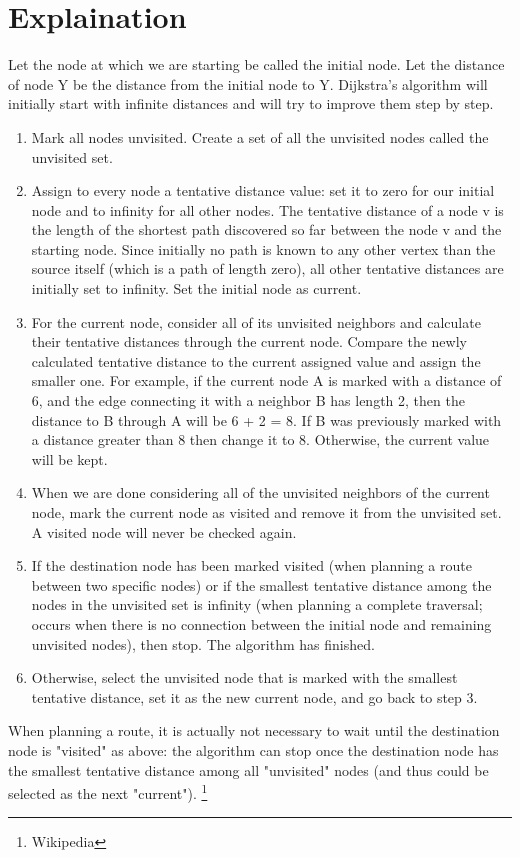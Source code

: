 \documentclass[12pt]{book}
\begin{document}
\section*{Explaination}
{\small
Let the node at which we are starting be called the initial node. 
Let the distance of node Y be the distance from the initial node to Y. 
Dijkstra's algorithm will initially start with infinite distances 
and will try to improve them step by step.
\begin{enumerate}
        \item Mark all nodes unvisited. Create a set of all the unvisited nodes called the unvisited set.
        \item Assign to every node a tentative distance value: set it to zero for our initial node and to infinity for all other nodes. The tentative distance of a node v is the length of the shortest path discovered so far between the node v and the starting node. Since initially no path is known to any other vertex than the source itself (which is a path of length zero), all other tentative distances are initially set to infinity. Set the initial node as current.
        \item For the current node, consider all of its unvisited neighbors and calculate their tentative distances through the current node. Compare the newly calculated tentative distance to the current assigned value and assign the smaller one. For example, if the current node A is marked with a distance of 6, and the edge connecting it with a neighbor B has length 2, then the distance to B through A will be 6 + 2 = 8. If B was previously marked with a distance greater than 8 then change it to 8. Otherwise, the current value will be kept.
        \item When we are done considering all of the unvisited neighbors of the current node, mark the current node as visited and remove it from the unvisited set. A visited node will never be checked again.
        \item If the destination node has been marked visited (when planning a route between two specific nodes) or if the smallest tentative distance among the nodes in the unvisited set is infinity (when planning a complete traversal; occurs when there is no connection between the initial node and remaining unvisited nodes), then stop. The algorithm has finished.
        \item Otherwise, select the unvisited node that is marked with the smallest tentative distance, set it as the new current node, and go back to step 3.
\end{enumerate}
When planning a route, it is actually not necessary to wait until the destination node is "visited" as above: the algorithm can stop once the destination node has the smallest tentative distance among all "unvisited" nodes (and thus could be selected as the next "current").
\footnote{Wikipedia}
}
\end{document}
